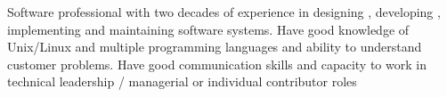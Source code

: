 

\begin{cvparagraph}
    Software professional with two decades of experience in designing , developing  , implementing and maintaining software systems. Have good knowledge of Unix/Linux and multiple programming languages and ability to understand customer problems. Have good communication skills and capacity to work in technical leadership / managerial or individual contributor roles
\end{cvparagraph}
